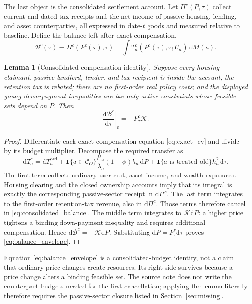 \documentclass[11pt]{article}
\newtheorem{lemma}{Lemma}
\newcommand{\dd}{\mathrm d}
\newcommand{\1}{\mathbf 1}
\begin{document}
The last object is the consolidated settlement account. Let
$\Pi^c(P,\tau)$ collect current and dated tax receipts and the net income of
passive housing, lending, and asset counterparties, all expressed in date-$t$
goods and measured relative to baseline. Define the balance left after exact
compensation,
\begin{equation}
\mathcal B^c(\tau)
=\Pi^c(P^c(\tau),\tau)
-\int T_a^c(P^c(\tau),\tau;\bar U_a)\,\dd M(a).
\label{eq:consolidated_balance}
\end{equation}

\begin{lemma}[Consolidated compensation identity]
\label{lem:compensation_identity}
Suppose every housing claimant, passive landlord, lender, and tax recipient is
inside the account; the retention tax is rebated; there are no first-order real
policy costs; and the displayed young down-payment inequalities are the only
active constraints whose feasible sets depend on $P$. Then
\begin{equation}
\left.\frac{\dd\mathcal B^c}{\dd\tau}\right|_{0}
=-P_\tau^c\mathcal K.
\label{eq:balance_envelope}
\end{equation}
\end{lemma}

\begin{proof}
Differentiate each exact-compensation equation \eqref{eq:exact_cv} and divide
by its budget multiplier. Decompose the required transfer as
\begin{equation}
\dd T_a^c
=\dd T_a^{\mathrm{ord}}
+\1\{a\in\mathcal C_O\}
 \frac{\mu_a}{\lambda_a}(1-\phi)h_a\,\dd P
+\1\{a\text{ is treated old}\}h_a^2\,\dd\tau.
\label{eq:cv_decomposition}
\end{equation}
The first term collects ordinary user-cost, asset-income, and wealth exposures.
Housing clearing and the closed ownership accounts imply that its integral is
exactly the corresponding passive-sector receipt in $\dd\Pi^c$. The last term
integrates to the first-order retention-tax revenue, also in $\dd\Pi^c$.
Those terms therefore cancel in \eqref{eq:consolidated_balance}. The middle
term integrates to $\mathcal K\dd P$: a higher price tightens a binding
down-payment inequality and requires additional compensation. Hence
$\dd\mathcal B^c=-\mathcal K\dd P$. Substituting
$\dd P=P_\tau^c\dd\tau$ proves \eqref{eq:balance_envelope}.
\end{proof}

Equation \eqref{eq:balance_envelope} is a consolidated-budget identity, not a
claim that ordinary price changes create resources. Its right side survives
because a price change alters a binding feasible set. The source note does not
write the counterpart budgets needed for the first cancellation; applying the
lemma literally therefore requires the passive-sector closure listed in
Section~\ref{sec:missing}.
\end{document}
